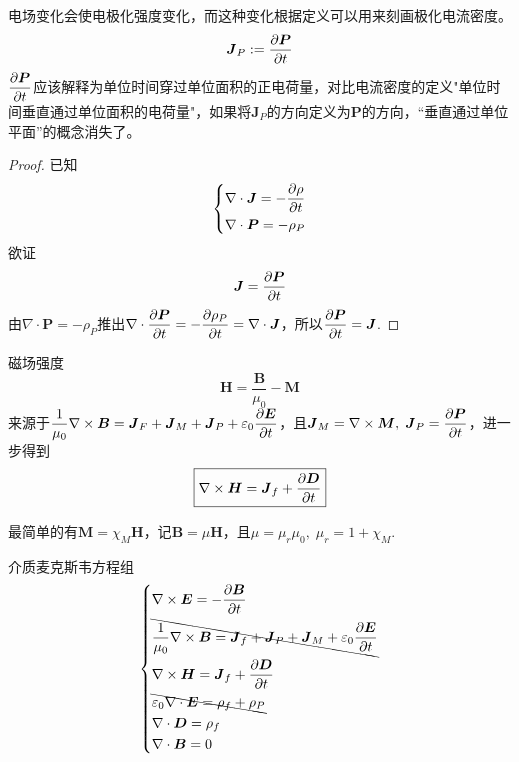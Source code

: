\documentclass{mynote}
\begin{document}
\begin{proposition}
    电场变化会使电极化强度变化，而这种变化根据定义可以用来刻画极化电流密度。
    \[
    \boldsymbol{J}_P := \dfrac{\partial \boldsymbol{P}}{\partial t}    
    \]
    $\dfrac{\partial \boldsymbol{P}}{\partial t}$应该解释为单位时间穿过单位面积的正电荷量，对比电流密度的定义"单位时间垂直通过单位面积的电荷量"，如果将$\bm{J}_P$的方向定义为$\bm{P}$的方向，“垂直通过单位平面”的概念消失了。
\end{proposition}
\begin{proof}
    已知
    \[
    \left\{
        \begin{aligned}
            & \nabla \cdot \boldsymbol{J} = -\dfrac{\partial \rho}{\partial t} \\
            & \nabla \cdot \boldsymbol{P} = -\rho_P
        \end{aligned} 
    \right.    
    \]
    欲证
    \[
    \boldsymbol{J} = \dfrac{\partial \boldsymbol{P}}{\partial t}    
    \]
    由$\nabla \cdot \bm{P} = -\rho_P$推出$\nabla \cdot \dfrac{\partial \boldsymbol{P}}{\partial t} = -\dfrac{\partial \rho_P}{\partial t} = \nabla \cdot \boldsymbol{J}$，所以$\dfrac{\partial \boldsymbol{P}}{\partial t} = \boldsymbol{J}$.
\end{proof}





\begin{define}{磁场强度}
    \[
    \boxed{
        \bm{H} = \frac{\bm{B}}{\mu_0} - \bm{M}
    }    
    \]
    来源于$\dfrac{1}{\mu_0} \nabla \times \boldsymbol{B} = \boldsymbol{J}_F + \boldsymbol{J}_M + \boldsymbol{J}_P + \varepsilon_0 \dfrac{\partial \boldsymbol{E}}{\partial t}$，且$\boldsymbol{J}_M = \nabla \times \boldsymbol{M},\; \boldsymbol{J}_P = \dfrac{\partial \boldsymbol{P}}{\partial t}$，进一步得到
    \[
    \boxed{
        \nabla \times \boldsymbol{H} = \boldsymbol{J}_f + \dfrac{\partial \boldsymbol{D}}{\partial t}
    }    
    \]
\end{define}



\begin{proposition}
    最简单的有$\bm{M} = \chi_M \bm{H}$，记$\bm{B} = \mu \bm{H}$，且$\mu = \mu_r \mu_0,\; \mu_r = 1 + \chi_M$.
\end{proposition}








\begin{theorem}{介质麦克斯韦方程组}
    \[
    \left\{
        \begin{aligned}
            & \nabla \times \boldsymbol{E} = -\dfrac{\partial \boldsymbol{B}}{\partial t} \\
            & \bcancel{ \dfrac{1}{\mu_0} \nabla \times \boldsymbol{B} = \boldsymbol{J}_f + \boldsymbol{J}_P + \boldsymbol{J}_M + \varepsilon_0 \dfrac{\partial \boldsymbol{E}}{\partial t} } \\
            & \nabla \times \boldsymbol{H} = \boldsymbol{J}_f + \dfrac{\partial \boldsymbol{D}}{\partial t} \\
            & \bcancel{\varepsilon_0 \nabla \cdot \boldsymbol{E} = \rho_f + \rho_P } \\
            & \nabla \cdot \boldsymbol{D} = \rho_f \\
            & \nabla \cdot \boldsymbol{B} = 0
        \end{aligned} 
    \right.    
    \]
\end{theorem}
\end{document}
